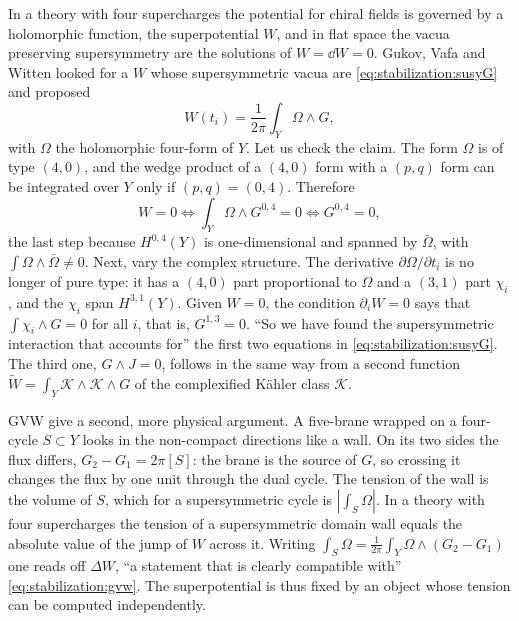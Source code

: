 In a theory with four supercharges the potential for chiral fields is governed by a holomorphic
function, the superpotential $W$, and in flat space the vacua preserving
supersymmetry are the solutions of $W=\dd W=0$. Gukov, Vafa and Witten looked for a $W$
whose supersymmetric vacua are \eqref{eq:stabilization:susyG} and proposed
\begin{equation}\label{eq:stabilization:gvw}
 W(t_i)=\frac{1}{2\pi}\int_Y\Omega\wedge G ,
\end{equation}
with $\Omega$ the holomorphic four-form of $Y$. Let us
check the claim. The form $\Omega$ is of type $(4,0)$, and the wedge product of a $(4,0)$
form with a $(p,q)$ form can be integrated over $Y$ only if $(p,q)=(0,4)$. Therefore
\begin{equation}\label{eq:stabilization:W04}
 W=0\iff \int_Y\Omega\wedge G^{0,4}=0\iff G^{0,4}=0,
\end{equation}
the last step because $H^{0,4}(Y)$ is one-dimensional and spanned by $\bar\Omega$, with
$\int\Omega\wedge\bar\Omega\neq0$. Next, vary the complex structure. The derivative
$\partial\Omega/\partial t_i$ is no longer of pure type: it has a $(4,0)$ part proportional to
$\Omega$ and a $(3,1)$ part $\chi_i$, and the $\chi_i$ span $H^{3,1}(Y)$. Given $W=0$, the
condition $\partial_iW=0$ says that $\int\chi_i\wedge G=0$ for all $i$, that is, $G^{1,3}=0$.
``So we have found the supersymmetric interaction that accounts for'' the first two
equations in \eqref{eq:stabilization:susyG}.  The third one,
$G\wedge J=0$, follows in the same way from a second function
$\widetilde W=\int_Y\mathcal K\wedge\mathcal K\wedge G$ of the complexified K\"ahler class
$\mathcal K$. 

\begin{physicsbox}
GVW give a second, more physical argument. A five-brane wrapped on a four-cycle $S\subset Y$
looks in the non-compact directions like a wall. On its two sides the flux differs,
$G_2-G_1=2\pi[S]$: the brane is the source of $G$, so crossing it changes the flux by one unit
through the dual cycle. The tension of the wall is the volume of $S$, which for a
supersymmetric cycle is $|\int_S\Omega|$. In a theory with four supercharges the tension of a
supersymmetric domain wall equals the absolute value of the jump of $W$ across it. Writing
$\int_S\Omega=\frac1{2\pi}\int_Y\Omega\wedge(G_2-G_1)$ one reads off $\Delta W$, ``a statement
that is clearly compatible with'' \eqref{eq:stabilization:gvw}.
 The superpotential is thus fixed by an
object whose tension can be computed independently.
\end{physicsbox}

